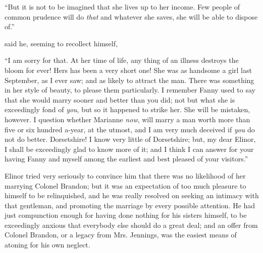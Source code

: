 
“But it is not to be imagined that she lives up to her income. Few people of common prudence will do {\em that} and whatever she saves, she will be able to dispose of.”




 said he, seeming to recollect himself, 


“I am sorry for that. At her time of life, any thing of an illness destroys the bloom for ever! Hers has been a very short one! She was as handsome a girl last September, as I ever saw; and as likely to attract the man. There was something in her style of beauty, to please them particularly. I remember Fanny used to say that she would marry sooner and better than you did; not but what she is exceedingly fond of {\em you}, but so it happened to strike her. She will be mistaken, however. I question whether Marianne {\em now}, will marry a man worth more than five or six hundred a-year, at the utmost, and I am very much deceived if {\em you} do not do better. Dorsetshire! I know very little of Dorsetshire; but, my dear Elinor, I shall be exceedingly glad to know more of it; and I think I can answer for your having Fanny and myself among the earliest and best pleased of your visitors.”

Elinor tried very seriously to convince him that there was no likelihood of her marrying Colonel Brandon; but it was an expectation of too much pleasure to himself to be relinquished, and he was really resolved on seeking an intimacy with that gentleman, and promoting the marriage by every possible attention. He had just compunction enough for having done nothing for his sisters himself, to be exceedingly anxious that everybody else should do a great deal; and an offer from Colonel Brandon, or a legacy from Mrs. Jennings, was the easiest means of atoning for his own neglect.

